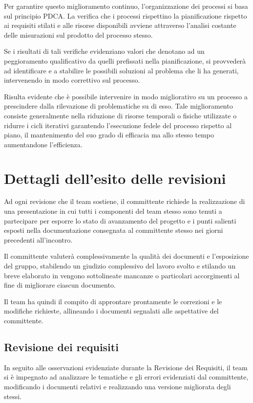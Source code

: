 Per garantire questo miglioramento continuo, l'organizzazione dei processi si basa sul principio PDCA\@. La verifica che i processi rispettino la pianificazione rispetto ai requisiti stilati e alle risorse disponibili avviene attraverso l'analisi costante delle misurazioni sul prodotto del processo stesso.

Se i risultati di tali verifiche evidenziano valori che denotano ad un peggioramento qualificativo da quelli prefissati nella pianificazione, si provvederà ad identificare e a stabilire le possibili soluzioni al problema che li ha generati, intervenendo in modo correttivo sul processo. \

Risulta evidente che è possibile intervenire in modo migliorativo su un processo a prescindere dalla rilevazione di problematiche su di esso. Tale miglioramento consiste generalmente nella riduzione di risorse temporali o fisiche utilizzate o ridurre i cicli iterativi garantendo l'esecuzione fedele del processo rispetto al piano, il mantenimento del suo grado di efficacia ma allo stesso tempo aumentandone l'efficienza.
\clearpage

\section{Dettagli dell'esito delle revisioni}
Ad ogni revisione che il team sostiene, il committente richiede la realizzazione di una presentazione in cui tutti i componenti del team stesso sono tenuti a partecipare per esporre lo stato di avanzamento del progetto e i punti salienti esposti nella documentazione consegnata al committente stesso nei giorni precedenti all'incontro.

Il committente valuterà complessivamente la qualità dei documenti e l'esposizione del gruppo, stabilendo un giudizio complessivo del lavoro svolto e stilando un breve elaborato in vengono sottolineate mancanze o particolari accorgimenti al fine di migliorare ciascun documento.

Il team ha quindi il compito di approntare prontamente le correzioni e le modifiche richieste, allineando i documenti segnalati alle aspettative del committente.

\subsection{Revisione dei requisiti}
In seguito alle osservazioni evidenziate durante la Revisione dei Requisiti, il team si è impegnato ad analizzare le tematiche e gli errori evidenziati dal committente, modificando i documenti relativi e realizzando una versione migliorata degli stessi.

